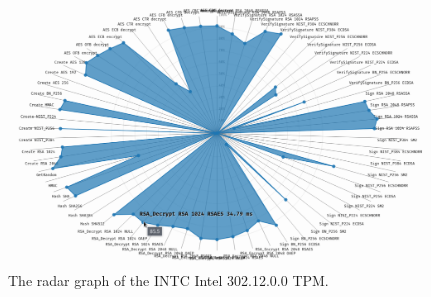 \begin{landscape}
\begin{figure}[!t]
    \centering
    \includegraphics[width=\linewidth]{img/visualizations/INTC_Intel_302.12.0.0 radar graph.png}
    \caption{
    The radar graph of the INTC Intel 302.12.0.0 TPM.
    }
\end{figure}
\end{landscape}
